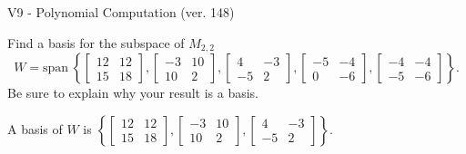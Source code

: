 \begin{exercise}
  \begin{exerciseTitle}V9 - Polynomial Computation (ver. 148)\end{exerciseTitle}
  \begin{exerciseStatement}
    Find a basis for the subspace of \(M_{2,2}\) 
\[W=\mathrm{span}\ \left\{\left[\begin{array}{cc}
12 & 12 \\
15 & 18
\end{array}\right] , \left[\begin{array}{cc}
-3 & 10 \\
10 & 2
\end{array}\right] , \left[\begin{array}{cc}
4 & -3 \\
-5 & 2
\end{array}\right] , \left[\begin{array}{cc}
-5 & -4 \\
0 & -6
\end{array}\right] , \left[\begin{array}{cc}
-4 & -4 \\
-5 & -6
\end{array}\right]\right\}.\]
 Be sure to explain why your result is a basis.


  \end{exerciseStatement}
  \begin{exerciseAnswer}
   A basis of \(W\) is  \(\left\{\left[\begin{array}{cc}
12 & 12 \\
15 & 18
\end{array}\right] , \left[\begin{array}{cc}
-3 & 10 \\
10 & 2
\end{array}\right] , \left[\begin{array}{cc}
4 & -3 \\
-5 & 2
\end{array}\right]\right\}\).
  


  \end{exerciseAnswer}
\end{exercise}